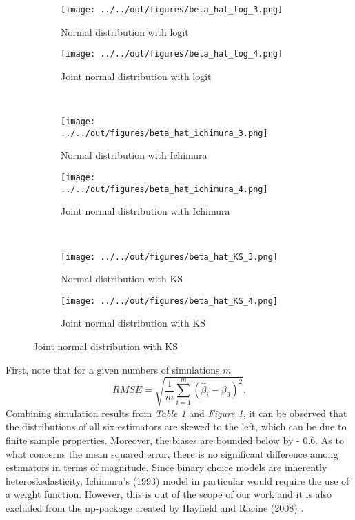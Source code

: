 \begin{figure}
\caption{Simulation results: comparison between normal and joint normal distribution of error term}
\centering
\begin{subfigure}{.5\textwidth}
  \centering
  \texttt{[image: ../../out/figures/beta\_hat\_log\_3.png]}
  \caption{Normal distribution with logit}
\end{subfigure}%
\begin{subfigure}{.5\textwidth}
  \centering
  \texttt{[image: ../../out/figures/beta\_hat\_log\_4.png]}
  \caption{Joint normal distribution with logit}
\end{subfigure}%
\\
\begin{subfigure}{.5\textwidth}
  \centering
  \texttt{[image: ../../out/figures/beta\_hat\_ichimura\_3.png]}
  \caption{Normal distribution with Ichimura}
\end{subfigure}%
\begin{subfigure}{.5\textwidth}
  \centering
  \texttt{[image: ../../out/figures/beta\_hat\_ichimura\_4.png]}
  \caption{Joint normal distribution with Ichimura}
\end{subfigure}%
\\
\begin{subfigure}{.5\textwidth}
  \centering
  \texttt{[image: ../../out/figures/beta\_hat\_KS\_3.png]}
  \caption{Normal distribution with KS}
\end{subfigure}%
\begin{subfigure}{.5\textwidth}
  \centering
  \texttt{[image: ../../out/figures/beta\_hat\_KS\_4.png]}
  \caption{Joint normal distribution with KS}
\end{subfigure}%
\end{figure}



First, note that for a given numbers of simulations $m$
\[RMSE = \sqrt{\frac{1}{m}\sum_{i=1}^m\left(\hat{\beta}_i - \beta_0\right)^2}.\]
Combining simulation results from \textit{Table 1} and \textit{Figure 1}, it can be observed that the distributions of all six estimators are skewed to the left, which can be due to finite sample properties. Moreover, the biases are bounded below by - 0.6. 
As to what concerns the mean squared error, there is no significant difference among estimators in terms of magnitude. Since binary choice models are inherently heteroskedasticity, Ichimura’s (1993) \cite{[6]} model in particular would require the use of a weight function. However, this is out of the scope of our work and it is also excluded from the np-package created by Hayfield and Racine (2008) \cite{[28]}.

